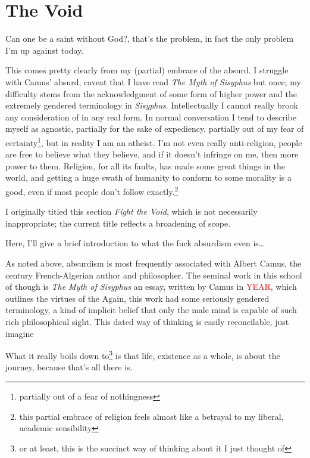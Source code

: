 \documentclass[../butidigress.tex]{subfiles}
\begin{document}
\chapter{The Void}\label{chap:thevoid}
\epigraph{Can one be a saint without God?, that's the problem, in fact the only problem I'm up against today.}{}
\newpage
This comes pretty clearly from my (partial) embrace of the absurd.
I struggle with Camus' absurd, caveat that I have read \textit{The Myth of Sisyphus} but once; my difficulty stems from the acknowledgment of some form of higher power and the extremely gendered terminology in \textit{Sisyphus}.
Intellectually I cannot really brook any consideration of  in any real form.
In normal conversation I tend to describe myself as agnostic, partially for the sake of expediency, partially out of my fear of certainty\footnote{partially out of a fear of nothingness}, but in reality I am an atheist.
I'm not even really anti-religion, people are free to believe what they believe, and if it doesn't infringe on me, then more power to them.
Religion, for all its faults, has made some great things in the world, and getting a huge swath of humanity to conform to some morality is a good, even if most people don't follow exactly.\footnote{this partial embrace of religion feels almost like a betrayal to my liberal, academic sensibility}

I originally titled this section \textit{Fight the Void}, which is not necessarily inappropriate; the current title reflects a broadening of scope.

\entryskip

Here, I'll give a brief introduction to what the fuck absurdism even is\ldots

As noted above, absurdism is most frequently associated with Albert Camus, the  century French-Algerian author and philosopher.
The seminal work in this school of though is \textit{The Myth of Sisyphus} an essay, written by Camus in \textcolor{red}{YEAR}, which outlines the virtues of the 
Again, this work had some seriously gendered terminology, a kind of implicit belief that only the male mind is capable of such rich philosophical sight.
This dated way of thinking is easily reconcilable, just imagine 

What it really boils down to\footnote{or at least, this is the succinct way of thinking about it I just thought of} is that life, existence as a whole, is about the journey, because that's all there is.
\end{document}
